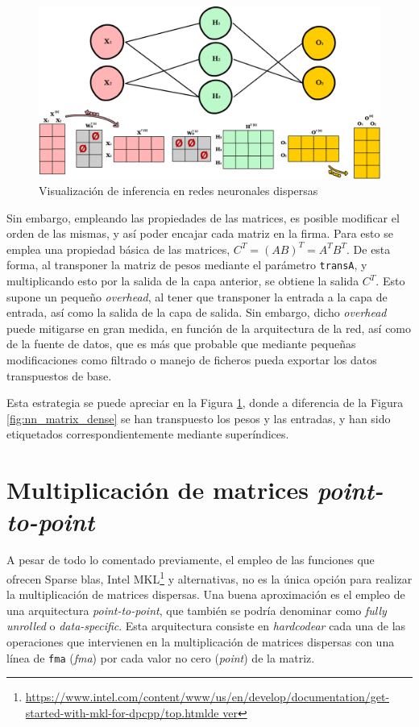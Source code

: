 \begin{figure}[h!]
    \centering
    \includegraphics[width=\textwidth]{img/neural_network_matrix_sparse/neural_network_matrix_sparse.png}
    \caption{Visualización de inferencia en redes neuronales dispersas}
    \label{fig:nn_matrix_sparse}
\end{figure}

Sin embargo, empleando las propiedades de las matrices, es posible modificar el orden de las mismas, y así poder encajar cada matriz en la firma. Para esto se emplea una propiedad básica de las matrices, $C^{T} = (AB)^{T} = A^{T}B^{T}$. De esta forma, al transponer la matriz de pesos mediante el parámetro \texttt{transA}, y multiplicando esto por la salida de la capa anterior, se obtiene la salida $C^{T}$. Esto supone un pequeño \textit{overhead}, al tener que transponer la entrada a la capa de entrada, así como la salida de la capa de salida. Sin embargo, dicho \textit{overhead} puede mitigarse en gran medida, en función de la arquitectura de la red, así como de la fuente de datos, que es más que probable que mediante pequeñas modificaciones como filtrado o manejo de ficheros pueda exportar los datos transpuestos de base.

Esta estrategia se puede apreciar en la Figura \ref{fig:nn_matrix_sparse}, donde a diferencia de la Figura \ref{fig:nn_matrix_dense} se han transpuesto los pesos y las entradas, y han sido etiquetados correspondientemente mediante superíndices.

\section{Multiplicación de matrices \textit{point-to-point}}
\label{sec:multiplicacion_point_to_point}
A pesar de todo lo comentado previamente, el empleo de las funciones que ofrecen Sparse \acrshort{blas}, Intel MKL\footnote{\url{https://www.intel.com/content/www/us/en/develop/documentation/get-started-with-mkl-for-dpcpp/top.htmlde ver}} y alternativas, no es la única opción para realizar la multiplicación de matrices dispersas. Una buena aproximación es el empleo de una arquitectura \textit{point-to-point}, que también se podría denominar como \textit{fully unrolled} o \textit{data-specific}. Esta arquitectura consiste en \textit{hardcodear} cada una de las operaciones que intervienen en la multiplicación de matrices dispersas con una línea de \texttt{\acrshort{fma}} (\textit{\acrlong{fma}}) por cada valor no cero (\textit{point}) de la matriz.

